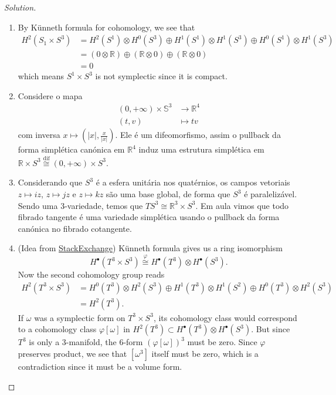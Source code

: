 \begin{proof}[Solution]\leavevmode
	\begin{enumerate}[label=\alph*.]
		\item By K\"unneth formula for cohomology, we see that
			\begin{align*}
				H^{2}(S_1\times S^3)&=H^{2}(S^1)\otimes H^{0}(S^3)\oplus H^{1}(S^1)\otimes H^{1}(S^3)\oplus H^{0}(S^1)\otimes H^{1}(S^3)\\
				&=(0\otimes  \mathbb{R})\oplus (\mathbb{R}\otimes 0)\oplus (\mathbb{R}\otimes 0)\\
				&=0
			\end{align*}
		which means $S^1\times S^3$ is not symplectic since it is compact.

		\item Considere o mapa
			\begin{align*}
				(0,+\infty)\times \mathbb{S}^3 &\longrightarrow \mathbb{R}^4 \\
				(t,v) &\longmapsto tv
			\end{align*}
			com inversa $x\mapsto \left( |x|,\frac{x}{|x|} \right)$. Ele \'e um difeomorfismo, assim o pullback da forma simpl\'etica can\'onica em $\mathbb{R}^{4}$ induz uma estrutura simpl\'etica em $\mathbb{R}\times S^3\overset{\operatorname{dif}}{\cong} (0,+\infty)\times S^3$.

		\item Considerando que $S^3$ \'e a esfera unit\'aria nos quat\'ernios, os campos vetoriais $z\mapsto iz$, $z\mapsto jz$ e $z\mapsto kz$ s\~ao uma base global, de forma que $S^3$ \'e paraleliz\'avel. Sendo uma 3-variedade, temos que $TS^3\cong \mathbb{R}^{3}\times S^3$. Em aula vimos que todo fibrado tangente \'e uma variedade simpl\'etica usando o pullback da forma can\'onica no fibrado cotangente.

		\item (Idea from \href{https://math.stackexchange.com/questions/2746576/is-mathbbt3-times-mathbbs3-symplectic}{StackExchange}) K\"unneth formula gives us a ring isomorphism 
			\[H^{\bullet}(T^3\times S^3)\overset{\varphi}{\cong}H^{\bullet}(T^3)\otimes H^{\bullet}(S^3).\]
		Now the second cohomology group reads
			\begin{align*}
				H^{2}(T^3\times S^3)& =H^{0}(T^3)\otimes H^{2}(S^3)\oplus H^{1}(T^3)\otimes H^{1}(S^2)\oplus H^{0}(T^3)\otimes H^{2}(S^3)\\
				&=H^{2}(T^3).
			\end{align*}
			If $\omega$ was a symplectic form on $T^3\times S^3$, its cohomology class would correspond to a cohomology class $\varphi[\omega]$ in $H^{2}(T^3)\subset H^{\bullet}(T^3)\otimes H^{\bullet}(S^3)$. But since $T^3$ is only a 3-manifold, the 6-form $(\varphi[\omega])^3$ must be zero. Since $\varphi$ preserves product, we see that $[\omega^3]$ itself must be zero, which is a contradiction since it must be a volume form.
	\end{enumerate}
\end{proof}

